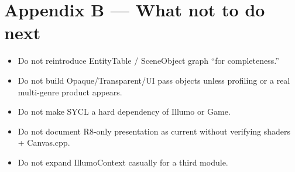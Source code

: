 \documentclass[10pt,a4paper]{article}
\begin{document}
\section{Appendix B --- What not to do next}
\begin{itemize}
    \item Do not reintroduce EntityTable / SceneObject graph ``for completeness.''
    \item Do not build Opaque/Transparent/UI pass objects unless profiling or a real multi-genre product appears.
    \item Do not make SYCL a hard dependency of Illumo or Game.
    \item Do not document R8-only presentation as current without verifying shaders + Canvas.cpp.
    \item Do not expand IllumoContext casually for a third module.
\end{itemize}
\end{document}
